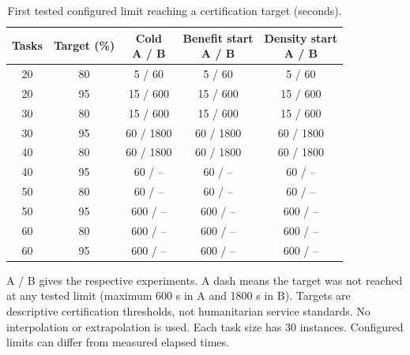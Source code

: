 \begin{table}[!htbp]
\centering
\caption{First tested configured limit reaching a certification target (seconds).}
\label{tab:AB-certification-thresholds}
\scriptsize
\setlength{\tabcolsep}{2.6pt}
\renewcommand{\arraystretch}{1.08}
\begin{tabular}{@{}ccccc@{}}
\toprule
Tasks & Target (\%) & \makecell{Cold\\A / B} & \makecell{Benefit start\\A / B} & \makecell{Density start\\A / B} \\
\midrule
20 & 80 & 5 / 60 & 5 / 60 & 5 / 60 \\
20 & 95 & 15 / 600 & 15 / 600 & 15 / 600 \\
30 & 80 & 15 / 600 & 15 / 600 & 15 / 600 \\
30 & 95 & 60 / 1800 & 60 / 1800 & 60 / 1800 \\
40 & 80 & 60 / 1800 & 60 / 1800 & 60 / 1800 \\
40 & 95 & 60 / -- & 60 / -- & 60 / -- \\
50 & 80 & 60 / -- & 60 / -- & 60 / -- \\
50 & 95 & 600 / -- & 600 / -- & 600 / -- \\
60 & 80 & 600 / -- & 600 / -- & 600 / -- \\
60 & 95 & 600 / -- & 600 / -- & 600 / -- \\
\bottomrule
\end{tabular}
\begin{minipage}{0.98\columnwidth}
\footnotesize
A / B gives the respective experiments. A dash means the target was not reached at any tested limit (maximum 600 s in A and 1800 s in B). Targets are descriptive certification thresholds, not humanitarian service standards. No interpolation or extrapolation is used. Each task size has 30 instances. Configured limits can differ from measured elapsed times.
\end{minipage}
\end{table}
